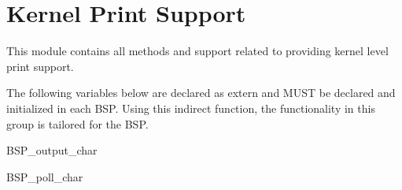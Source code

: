 \hypertarget{group__BSPIO}{}\section{Kernel Print Support}
\label{group__BSPIO}
This module contains all methods and support related to providing kernel level print support.

The following variables below are declared as extern and M\+U\+ST be declared and initialized in each B\+SP. Using this indirect function, the functionality in this group is tailored for the B\+SP.


\begin{DoxyItemize}
\item B\+S\+P\+\_\+output\+\_\+char
\item B\+S\+P\+\_\+poll\+\_\+char 
\end{DoxyItemize}